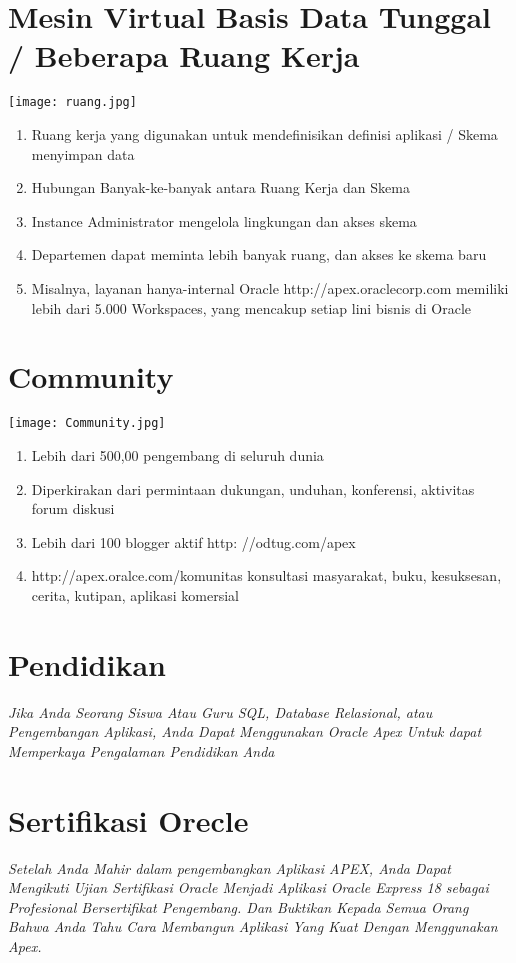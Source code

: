 \documentclass[a4paper,12pt]{report}
\begin{document}
\section{Mesin Virtual Basis Data Tunggal / Beberapa Ruang Kerja}
\begin{center}
    \texttt{[image: ruang.jpg]}
\end{center}
\begin{enumerate}
    \item Ruang kerja yang digunakan untuk mendefinisikan definisi aplikasi / Skema menyimpan data
    \item Hubungan Banyak-ke-banyak antara Ruang Kerja dan Skema
    \item Instance Administrator mengelola lingkungan dan akses skema
    \item Departemen dapat meminta lebih banyak ruang, dan akses ke skema baru
    \item Misalnya, layanan hanya-internal Oracle http://apex.oraclecorp.com memiliki lebih dari 5.000 Workspaces, yang mencakup setiap lini bisnis di Oracle
\end{enumerate}
\section{Community}
\begin{center}
    \texttt{[image: Community.jpg]}
\end{center}
\begin{enumerate}
    \item Lebih dari 500,00 pengembang di seluruh dunia
    \item Diperkirakan dari permintaan dukungan, unduhan, konferensi, aktivitas forum diskusi
    \item Lebih dari 100 blogger aktif http: //odtug.com/apex
    \item http://apex.oralce.com/komunitas konsultasi masyarakat, buku, kesuksesan, cerita, kutipan, aplikasi komersial
\end{enumerate}
\section{Pendidikan}
\textit{Jika Anda Seorang Siswa Atau Guru SQL, Database Relasional, atau Pengembangan Aplikasi, Anda Dapat Menggunakan Oracle Apex Untuk dapat Memperkaya Pengalaman Pendidikan Anda}
\section{Sertifikasi Orecle}
\textit{Setelah Anda Mahir dalam pengembangkan Aplikasi APEX, Anda Dapat Mengikuti Ujian Sertifikasi Oracle Menjadi Aplikasi Oracle Express 18 sebagai Profesional Bersertifikat Pengembang.
Dan Buktikan Kepada Semua Orang Bahwa Anda Tahu Cara Membangun Aplikasi Yang Kuat Dengan Menggunakan Apex.}
\end{document}
